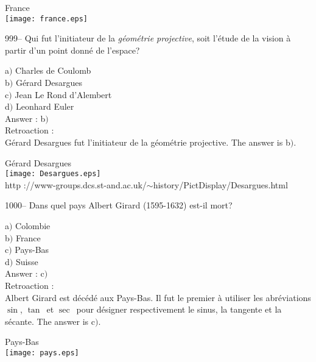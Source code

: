 ﻿\documentclass[letterpaper, 12pt]{article}
\begin{document}
        \begin{center}
        France\\
    \texttt{[image: france.eps]}\\
    \end{center}

999-- Qui fut l'initiateur de la {\sl g\'eom\'etrie projective},
soit l'\'etude de la vision \`a partir d'un point donn\'e de
l'espace?

a$)$ Charles de Coulomb \\
b$)$ G\'erard Desargues\\
c$)$ Jean Le Rond d'Alembert \\
d$)$ Leonhard Euler\\

Answer : b$)$\\

Retroaction : \\
G\'erard Desargues fut l'initiateur de la g\'eom\'etrie projective.
The answer is b$)$.\\



    \begin{center}
        G\'erard Desargues\\
    \texttt{[image: Desargues.eps]}\\
        {\footnotesize http
://www-groups.dcs.st-and.ac.uk/$\sim$history/PictDisplay/Desargues.html}
    \end{center}

1000-- Dans quel pays Albert Girard (1595-1632) est-il mort?

a$)$ Colombie \\
b$)$ France \\
c$)$ Pays-Bas \\
d$)$ Suisse\\

Answer : c$)$\\

Retroaction : \\
Albert Girard est d\'ec\'ed\'e aux Pays-Bas. Il fut le premier \`a
utiliser les abr\'eviations \og $\sin$\fg, \og $\tan$\fg\ et \og
$\sec$\fg\ pour d\'esigner respectivement le sinus, la tangente et
la s\'ecante.
The answer is c$)$.\\

        \begin{center}
        Pays-Bas\\
    \texttt{[image: pays.eps]}\\
    \end{center}
\end{document}
